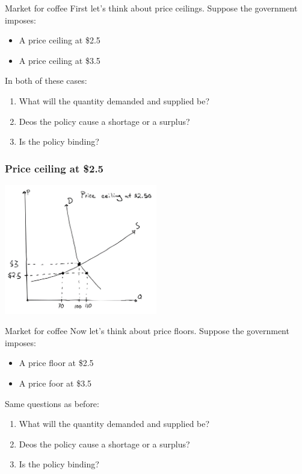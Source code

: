 \documentclass[aspectratio=169]{beamer}
\begin{document}
\begin{frame}{Market for coffee}
    First let's think about price ceilings. Suppose the government imposes:
    \begin{itemize}
        \item A price ceiling at \$2.5
        \item A price ceiling at \$3.5
    \end{itemize}

    \vspace{5mm}

    In both of these cases:
    \begin{enumerate}
        \item What will the quantity demanded and supplied be?
        \item Deos the policy cause a shortage or a surplus?
        \item Is the policy binding?
    \end{enumerate}
\end{frame}

\begin{frame}
    \frametitle{Price ceiling at \$2.5}
    \centering
    \includegraphics[width = 0.5\textwidth,keepaspectratio]{coffee_ceiling_250.png}
\end{frame}


\begin{frame}{Market for coffee}
    Now let's think about price floors. Suppose the government imposes:
    \begin{itemize}
        \item A price floor at \$2.5
        \item A price foor at \$3.5
    \end{itemize}

    \vspace{5mm}

    Same questions as before:
    \begin{enumerate}
        \item What will the quantity demanded and supplied be?
        \item Deos the policy cause a shortage or a surplus?
        \item Is the policy binding?
    \end{enumerate}
\end{frame}
\end{document}
